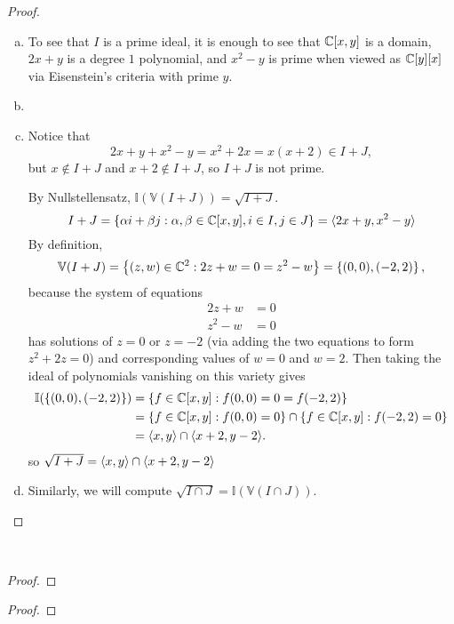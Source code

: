 \documentclass{article}
\begin{document}
\begin{proof} ~
  \begin{enumerate}[(a)]
    \item To see that $I$ is a prime ideal, it is enough to see that $\mathbb C[x,y]$
    is a domain, $2x + y$ is a degree $1$ polynomial, and $x^2 - y$ is prime
    when viewed as $\mathbb C[y][x]$ via Eisenstein's criteria with prime $y$.
    \item
    \item Notice that \[
      2x + y + x^2 - y = x^2 + 2x = x(x+2) \in I + J,
    \] but $x \not\in I + J$ and $x + 2 \not\in I + J$, so $I + J$ is not prime.

    By Nullstellensatz, $\mathbb I(\mathbb V(I + J)) = \sqrt{I + J}$.
    \[
      I + J
      = \left\{ \alpha i + \beta j : \alpha, \beta \in \mathbb C[x, y], i \in I, j \in J \right\}
      = \langle 2x + y, x^2 - y \rangle
    \]
    By definition, \[
      \mathbb V(I + J) = \left\{  (z,w) \in \mathbb C^2 : 2z + w = 0 = z^2 - w  \right\} = \left\{ (0, 0), (-2, 2) \right\},
    \] because the system of equations \begin{align*}
      2z + w &= 0 \\
      z^2 - w &= 0
    \end{align*} has solutions of $z = 0$ or $z = -2$ (via adding the two equations to form $z^2 + 2z = 0$) and
    corresponding values of $w = 0$ and $w = 2$. Then taking the ideal of
    polynomials vanishing on this variety gives \begin{align*}
      \mathbb I(\left\{ (0, 0), (-2, 2) \right\})
        &= \left\{  f \in \mathbb C[x,y] : f(0, 0) = 0 = f(-2, 2)  \right\} \\
        &= \left\{ f \in \mathbb C[x,y] : f(0, 0) = 0 \right\} \cap \left\{ f \in \mathbb C[x,y] : f(-2, 2) = 0 \right\} \\
        &= \langle x, y \rangle \cap \langle x + 2, y - 2 \rangle.
    \end{align*} so $\sqrt{I + J} = \langle x, y \rangle \cap \langle x + 2, y - 2 \rangle$
    \item Similarly, we will compute $\sqrt{I \cap J} = \mathbb I(\mathbb V(I \cap J))$.
  \end{enumerate}
\end{proof}
\pagebreak
\begin{problem}{4} ~
\end{problem}

\begin{proof}
\end{proof}
\pagebreak
\begin{problem}{5}

\end{problem}

\begin{proof}
\end{proof}
\end{document}
